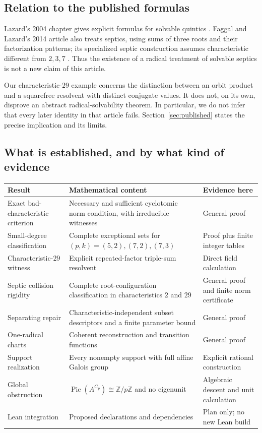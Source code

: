 \documentclass[11pt,a4paper]{article}
\theoremstyle{definition}
\theoremstyle{remark}
\newcommand{\Z}{\mathbb Z}
\newcommand{\Pic}{\operatorname{Pic}}
\begin{document}
\subsection{Relation to the published formulas}

Lazard's 2004 chapter gives explicit formulas for solvable quintics
\cite{Lazard2004}. Faggal and Lazard's 2014 article also treats septics, using
sums of three roots and their factorization patterns; its specialized septic
construction assumes characteristic different from $2,3,7$
\cite{FaggalLazard2014}. Thus the existence of a radical treatment of solvable
septics is not a new claim of this article.

Our characteristic-$29$ example concerns the distinction between an orbit
product and a squarefree resolvent with distinct conjugate values. It does
not, on its own, disprove an abstract radical-solvability theorem. In
particular, we do not infer that every later identity in that article fails.
Section~\ref{sec:published} states the precise implication and its limits.

\subsection{What is established, and by what kind of evidence}

\begin{center}
\small
\begin{tabularx}{\textwidth}{@{}L{0.26\textwidth}XL{0.22\textwidth}@{}}
\toprule
Result & Mathematical content & Evidence here \\
\midrule
Exact bad-characteristic criterion & Necessary and sufficient cyclotomic norm
condition, with irreducible witnesses & General proof \\
Small-degree classification & Complete exceptional sets for $(p,k)=(5,2),(7,2),(7,3)$
& Proof plus finite integer tables \\
Characteristic-$29$ witness & Explicit repeated-factor triple-sum resolvent
& Direct field calculation \\
Septic collision rigidity & Complete root-configuration classification in
characteristics $2$ and $29$ & General proof and finite norm certificate \\
Separating repair & Characteristic-independent subset descriptors and a
finite parameter bound & General proof \\
One-radical charts & Coherent reconstruction and transition functions
& General proof \\
Support realization & Every nonempty support with full affine Galois group
& Explicit rational construction \\
Global obstruction & $\Pic(A^{C_p})\cong\Z/p\Z$ and no eigenunit
& Algebraic descent and unit calculation \\
Lean integration & Proposed declarations and dependencies
& Plan only; no new Lean build \\
\bottomrule
\end{tabularx}
\end{center}
\end{document}
